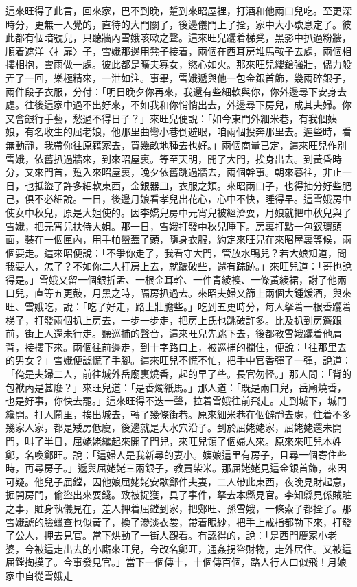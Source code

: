 \begin{showcontents}{}
這來旺得了此言，回來家，巴不到晚，踅到來昭屋裡，打酒和他兩口兒吃。至更深時分，更無一人覺的，直待的大門關了，後邊儀門上了拴，家中大小歇息定了。彼此都有個暗號兒，只聽牆內雪娥咳嗽之聲。這來旺兒躧着梯凳，黑影中扒過粉牆，順着遮洋〈扌扉〉子，雪娥那邊用凳子接着，兩個在西耳房堆馬鞍子去處，兩個相摟相抱，雲雨做一處。彼此都是曠夫寡女，慾心如火。那來旺兒纓鎗強壯，儘力般弄了一回，樂極精來，一泄如注。事畢，雪娥遞與他一包金銀首飾，幾兩碎銀子，兩件段子衣服，分付：「明日晚夕你再來，我還有些細軟與你，你外邊尋下安身去處。往後這家中過不出好來，不如我和你悄悄出去，外邊尋下房兒，成其夫婦。你又會銀行手藝，愁過不得日子？」來旺兒便說：「如今東門外細米巷，有我個姨娘，有名收生的屈老娘，他那里曲彎小巷倒避眼，咱兩個投奔那里去。遲些時，看無動靜，我帶你往原籍家去，買幾畝地種去也好。」兩個商量已定，這來旺兒作別雪娥，依舊扒過牆來，到來昭屋裏。等至天明，開了大門，挨身出去。到黃昏時分，又來門首，踅入來昭屋裏，晚夕依舊跳過牆去，兩個幹事。朝來暮往，非止一日，也抵盜了許多細軟東西，金銀器皿，衣服之類。來昭兩口子，也得抽分好些肥己，俱不必細說。一日，後邊月娘看孝兒出花心，心中不快，睡得早。這雪娥房中使女中秋兒，原是大姐使的。因李嬌兒房中元宵兒被經濟耍，月娘就把中秋兒與了雪娥，把元宵兒扶侍大姐。那一日，雪娥打發中秋兒睡下。房裏打點一包釵環頭面，裝在一個匣內，用手帕蠻蓋了頭，隨身衣服，約定來旺兒在來昭屋裏等候，兩個要走。這來昭便說：「不爭你走了，我看守大門，管放水鴨兒？若大娘知道，問我要人，怎了？不如你二人打房上去，就躧破些，還有踪跡。」來旺兒道：「哥也說得是。」雪娥又留一個銀折盂、一根金耳幹、一件青綾襖、一條黃綾裙，謝了他兩口兒，直等五更鼓，月黑之時，隔房扒過去。來昭夫婦又篩上兩個大鍾煖酒，與來旺、雪娥吃，說：「吃了好走，路上壯膽些。」吃到五更時分，每人拏着一根香躧着梯子，打發兩個扒上房去，一步一步走，把房上氏也跳破許多。比及扒到房簷跟前，街上人還未行走。聽巡捕的聲音，這來旺兒先跳下去，後都教雪娥躧着他肩背，接摟下來。兩個往前邊走，到十字路口上，被巡捕的攔住，便說：「往那里去的男女？」雪娥便諕慌了手腳。這來旺兒不慌不忙，把手中官香彈了一彈，說道：「俺是夫婦二人，前往城外岳廟裏燒香，起的早了些。長官勿怪。」那人問：「背的包袱內是甚麼？」來旺兒道：「是香燭紙馬。」那人道：「既是兩口兒，岳廟燒香，也是好事，你快去罷。」這來旺得不迭一聲，拉着雪娥往前飛走。走到城下，城門纔開。打人鬧里，挨出城去，轉了幾條街巷。原來細米巷在個僻靜去處，住着不多幾家人家，都是矮房低廈，後邊就是大水穴沿子。到於屈姥姥家，屈姥姥還未開門，叫了半日，屈姥姥纔起來開了門兒，來旺兒領了個婦人來。原來來旺兒本姓鄭，名喚鄭旺。說：「這婦人是我新尋的妻小。姨娘這里有房子，且尋一個寄住些時，再尋房子。」遞與屈姥姥三兩銀子，教買柴米。那屈姥姥見這金銀首飾，來因可疑。他兒子屈鏜，因他娘屈姥姥安歇鄭件夫妻，二人帶此東西，夜晚見財起意，掘開房門，偷盜出來耍錢。致被捉獲，具了事件，拏去本縣見官。李知縣見係賊賍之事，賍身執儀見在，差人押着屈鏜到家，把鄭旺、孫雪娥，一條索子都拴了。那雪娥諕的臉蠟查也似黃了，換了滲淡衣裳，帶着眼紗，把手上戒指都勒下來，打發了公人，押去見官。當下烘動了一街人觀看。有認得的，說：「是西門慶家小老婆，今被這走出去的小廝來旺兒，今改名鄭旺，通姦拐盜財物，走外居住。又被這屈鏜掏摸了。今事發見官。」當下一個傳十，十個傳百個，路人行人口似飛！月娘家中自從雪娥走
\end{showcontents}
